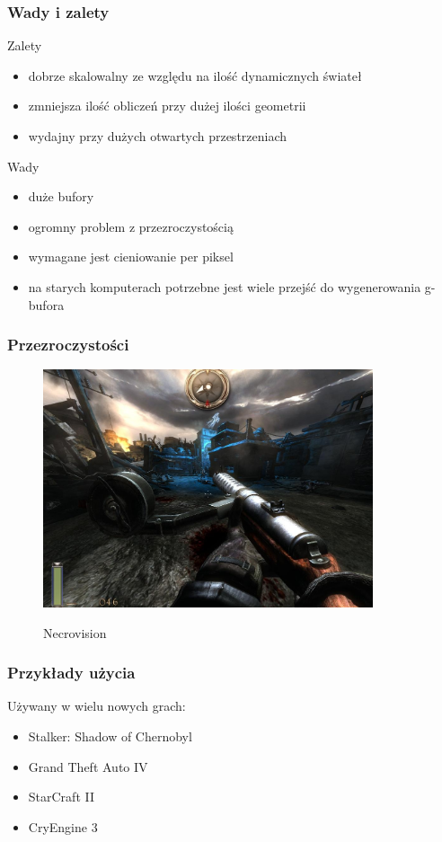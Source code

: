 \documentclass{beamer}
\begin{document}
\frame
{
	\frametitle{Wady i zalety}

	\begin{block}{Zalety}
	\begin{itemize}
	\item dobrze skalowalny ze względu na ilość dynamicznych świateł
		\item zmniejsza ilość obliczeń przy dużej ilości geometrii
		\item wydajny przy dużych otwartych przestrzeniach
		\end{itemize}
	\end{block}
	\begin{block}{Wady}
	\begin{itemize}
	\item duże bufory
		\item ogromny problem z przezroczystością
		\item wymagane jest cieniowanie per piksel
		\item na starych komputerach potrzebne jest wiele przejść do wygenerowania g-bufora
		\end{itemize}
	\end{block}
}

\frame
{
	\frametitle {Przezroczystości}

	\begin{figure}
	\centering
		\includegraphics[height=7cm]{img/necro.jpg}
	\label{fig:necro}
	\caption*{Necrovision}
	\end{figure}
}

\frame
{
	\frametitle{Przykłady użycia}

	Używany w wielu nowych grach:

		\begin{itemize}
	\item Stalker: Shadow of Chernobyl
		\item Grand Theft Auto IV
		\item StarCraft II
		\item CryEngine 3
		\end{itemize}
}
\end{document}
